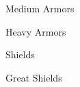 \begin{multicols}{2}
{\tabulinesep=1mm
\begin{armortable}{Medium \linebreak Armors}

\end{armortable}}

{\tabulinesep=1mm
\begin{armortable}{Heavy Armors}

\end{armortable}}

{\tabulinesep=1mm
\begin{armortable}{Shields}

\end{armortable}}

{\tabulinesep=1mm
\begin{armortable}{Great Shields}

\end{armortable}}

\end{multicols}